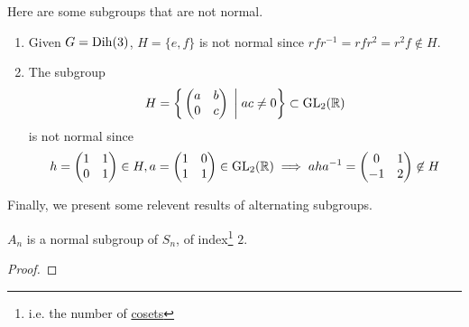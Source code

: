   \begin{example}
    \label{ex:subgroups-that-are-not-normal}
    Here are some subgroups that are not normal. 
    \begin{enumerate}
      \item Given $G = \operatorname{Dih}(3)$, $H = \{e, f\}$ is not normal since $rf r^{-1} = r f r^2 = r^2 f \not\in H$. 
      \item The subgroup 
      \begin{equation}
        H = \bigg\{ \begin{pmatrix} a & b \\ 0 & c \end{pmatrix} \; \bigg| \; ac \neq 0 \bigg\} \subset \operatorname{GL}_2 (\mathbb{R})
      \end{equation} 
      is not normal since 
      \begin{equation}
        h = \begin{pmatrix} 1 & 1 \\ 0 & 1 \end{pmatrix} \in H , a = \begin{pmatrix} 1 & 0  \\ 1 & 1 \end{pmatrix} \in \operatorname{GL}_2 (\mathbb{R}) \implies a h a^{-1} = \begin{pmatrix} 0 & 1 \\ -1 & 2 \end{pmatrix} \not\in H
      \end{equation}
    \end{enumerate}
  \end{example}

  Finally, we present some relevent results of alternating subgroups. 

  \begin{theorem}
    \label{thm:alternating-group-is-normal-in-symmetric}
    $A_n$ is a normal subgroup of $S_n$, of index\footnote{i.e. the number of \hyperref[def:coset]{cosets}} $2$. 
  \end{theorem}
  \begin{proof}
    
  \end{proof} 

